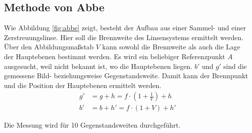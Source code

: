 \subsection{Methode von Abbe}
Wie Abbildung \ref{fig:abbe} zeigt, besteht der Aufbau aus einer Sammel- und einer Zerstreuungslinse. Hier soll die Brennweite des Linsensystems ermittelt werden. Über den Abbildungsmaßstab $V$ kann sowohl die Brennweite als auch die Lage der Hauptebenen bestimmt werden. Es wird ein beliebiger Referenzpunkt $A$ ausgesucht, weil nicht bekannt ist, wo die Hauptebenen liegen. $b'$ und $g'$ sind die gemessene Bild- beziehungsweise Gegenstandsweite. Damit kann der Brennpunkt und die Position der Hauptebenen ermittelt werden.
\begin{align}
  g' &= g + h = f \cdot\left( 1+\frac{1}{V}\right)+h\\
  b' &= b + h' = f \cdot (1 + V) + h'
\end{align}

Die Messung wird für 10 Gegenstandsweiten durchgeführt.
